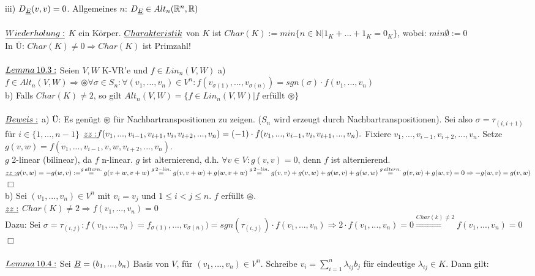 \documentclass[fleqn, a4paper, 11pt]{scrartcl}
\newcommand{\NN}{\mathbb{N}}
\newcommand{\RR}{\mathbb{R}}
\theoremstyle{definition}
\begin{document}
iii) $D_{\uline{E}}(v,v)=0$. Allgemeines $n$: $D_{\uline{E}}\in Alt_n(\RR^n,\RR)$\\
\\
$\uline{Wiederholung:}$ $K$ ein Körper. $\uline{Charakteristik}$ von $K$ ist $Char(K):=min\{n\in\NN | 1_K+...+1_K=0_K\}$, wobei: $min\emptyset:=0$\\
In \"U: $Char(K)\neq 0\Rightarrow Char(K)$ ist Primzahl!\\
\\
$\uline{Lemma\:10.3:}$ Seien $V,W$ K-VR'e und $f\in Lin_n(V,W)$ a) $f\in Alt_n(V,W)\Rightarrow \circledast \forall\sigma\in S_n:\forall(v_1,...,v_n)\in V^n:f(v_{\sigma(1)},...,v_{\sigma(n)})=sgn(\sigma)\cdot f(v_1,...,v_n)$\\
b) Falls $Char(K)\neq 2$, so gilt $Alt_n(V,W)=\{f\in Lin_n(V,W) | f\text{ erfüllt }\circledast\}$\\
\\
$\uline{Beweis:}$ a) \"U: Es genügt $\circledast$ für Nachbartranspositionen zu zeigen. ($S_n$ wird erzeugt durch Nachbartranspositionen). Sei also $\sigma=\tau_{(i,i+1)}$ für $i\in\{1,...,n-1\}$ $\uline{zz:}f(v_1,...,v_{i-1},v_{i+1},v_i,v_{i+2},...,v_n)=(-1)\cdot f(v_1,...,v_{i-1},v_i,v_{i+1},...,v_n).$ Fixiere $v_1,...,v_{i-1},v_{i+2},...,v_n$. Setze $g(v,w)=f(v_1,...,v_{i-1},v,w,v_{i+2},...,v_n)$.\\
$g$ 2-linear (bilinear), da $f$ n-linear. $g$ ist alternierend, d.h. $\forall v\in V:g(v,v)=0$, denn $f$ ist alternierend.\\
$\uline{zz:}g(v,w)=-g(w,v):=\stackrel{g\:altern.}{=}g(v+w,v+w)\stackrel{g\:2-lin.}{=}g(v,v+w)+g(w,v+w)\stackrel{g\:2-lin.}{=}g(v,v)+g(v,w)+g(w,v)+g(w,w)\stackrel{g\:altern.}{=}g(v,w)+g(w,v)=0\Rightarrow -g(w,v)=g(v,w)$ \hfill $\Box$\\
b) Sei $(v_1,...,v_n)\in V^n$ mit $v_i=v_j$ und $1\leq i<j\leq n$. $f$ erfüllt $\circledast$.\\
$\uline{zz:}$ $Char(K)\neq 2\Rightarrow f(v_1,...,v_n)=0$\\
Dazu: Sei $\sigma=\tau_{(i,j)}:f(v_1,...,v_n)=f_{\sigma(1)},...,v_{\sigma(n)})=sgn(\tau_{(i,j)})\cdot f(v_1,...,v_n)\Rightarrow 2\cdot f(v_1,...,v_n)=0\stackrel{Char(k)\neq 2}{\Rightarrow}f(v_1,...,v_n)=0$ \hfill $\Box$\\
\\
$\uline{Lemma\:10.4:}$ Sei $\uline{B}=(b_1,...,b_n)$ Basis von $V$, für $(v_1,...,v_n)\in V^n$. Schreibe $v_i=\sum\limits_{i=1}^n \lambda_{ij} b_j$ für eindeutige $\lambda_{ij} \in K$. Dann gilt:\\
\end{document}
